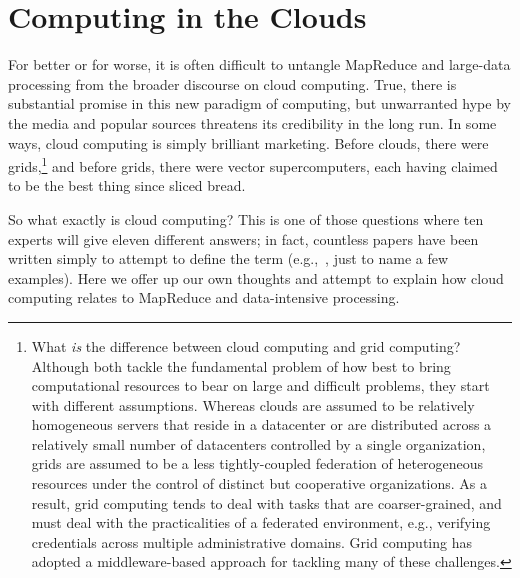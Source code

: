 \section{Computing in the Clouds}
\label{chapter1:clouds}

For better or for worse, it is often difficult to untangle MapReduce
and large-data processing from the broader discourse on cloud
computing.  True, there is substantial promise in this new paradigm of
computing, but unwarranted hype by the media and popular sources
threatens its credibility in the long run.  In some ways, cloud
computing is simply brilliant marketing.  Before clouds, there were
grids,\footnote{What {\it is} the difference between cloud computing
  and grid computing?  Although both tackle the fundamental problem of
  how best to bring computational resources to bear on large and
  difficult problems, they start with different assumptions.  Whereas
  clouds are assumed to be relatively homogeneous servers that reside
  in a datacenter or are distributed across a relatively small number
  of datacenters controlled by a single organization, grids are
  assumed to be a less tightly-coupled federation of heterogeneous
  resources under the control of distinct but cooperative
  organizations.  As a result, grid computing tends to deal with tasks
  that are coarser-grained, and must deal with the practicalities of a
  federated environment, e.g., verifying credentials across multiple
  administrative domains.  Grid computing has adopted a
  middleware-based approach for tackling many of these challenges.}
and before grids, there were vector supercomputers, each having
claimed to be the best thing since sliced bread.

So what exactly is cloud computing?  This is one of those questions
where ten experts will give eleven different answers; in fact,
countless papers have been written simply to attempt to define the
term
(e.g.,~\cite{Armbrust_etal_2009,Buyya_etal_2009,Vaquero_etal_2009},
just to name a few examples).  Here we offer up our own thoughts and
attempt to explain how cloud computing relates to MapReduce and
data-intensive processing.

